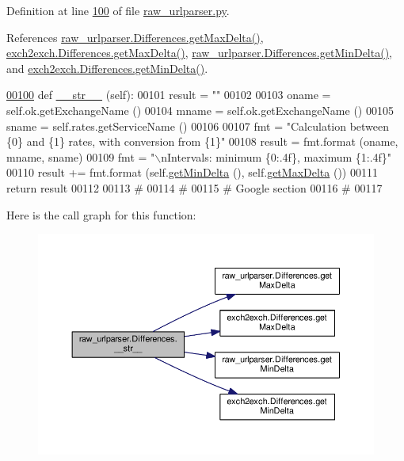 Definition at line \hyperlink{raw__urlparser_8py_source_l00100}{100} of file \hyperlink{raw__urlparser_8py_source}{raw\+\_\+urlparser.\+py}.



References \hyperlink{raw__urlparser_8py_source_l00097}{raw\+\_\+urlparser.\+Differences.\+get\+Max\+Delta()}, \hyperlink{exch2exch_8py_source_l00129}{exch2exch.\+Differences.\+get\+Max\+Delta()}, \hyperlink{raw__urlparser_8py_source_l00094}{raw\+\_\+urlparser.\+Differences.\+get\+Min\+Delta()}, and \hyperlink{exch2exch_8py_source_l00126}{exch2exch.\+Differences.\+get\+Min\+Delta()}.


\begin{DoxyCode}
\hypertarget{classraw__urlparser_1_1_differences.tex_l00100}{}\hyperlink{classraw__urlparser_1_1_differences_ae30a248dbbe9fde42b0bcbd81160f070}{00100}     \textcolor{keyword}{def }\hyperlink{classraw__urlparser_1_1_differences_ae30a248dbbe9fde42b0bcbd81160f070}{\_\_str\_\_} (self):
00101         result = \textcolor{stringliteral}{""}
00102         
00103         oname = self.ok.getExchangeName ()
00104         mname = self.ok.getExchangeName ()
00105         sname = self.rates.getServiceName ()
00106         
00107         fmt = \textcolor{stringliteral}{"Calculation between \{0\} and \{1\} rates, with conversion from \{1\}"}
00108         result = fmt.format (oname, mname, sname)
00109         fmt = \textcolor{stringliteral}{"\(\backslash\)nIntervals: minimum \{0:.4f\}, maximum \{1:.4f\}"}
00110         result += fmt.format (self.\hyperlink{classraw__urlparser_1_1_differences_af19faaea85ca8ac0d327c8443ddd99ef}{getMinDelta} (), self.\hyperlink{classraw__urlparser_1_1_differences_acfa09d743c08cc813a5bc435aa6875da}{getMaxDelta} ())
00111         \textcolor{keywordflow}{return} result
00112 
00113 \textcolor{comment}{#        }
00114 \textcolor{comment}{# }
00115 \textcolor{comment}{# Google section }
00116 \textcolor{comment}{#}
00117 
\end{DoxyCode}


Here is the call graph for this function\+:\nopagebreak
\begin{figure}[H]
\begin{center}
\leavevmode
\includegraphics[width=350pt]{classraw__urlparser_1_1_differences_ae30a248dbbe9fde42b0bcbd81160f070_cgraph}
\end{center}
\end{figure}



